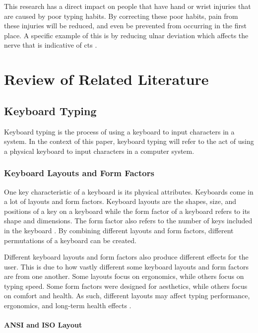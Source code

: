 \documentclass{report}
\begin{document}
This research has a direct impact on people that have hand or wrist injuries
that are caused by poor typing habits. By correcting these poor habits, pain
from these injuries will be reduced, and even be prevented from occurring in the
first place. A specific example of this is by reducing ulnar deviation which
affects the nerve that is indicative of \ac{cts} \parencite{toosi2015}.

\chapter{Review of Related Literature}

\section{Keyboard Typing}

Keyboard typing is the process of using a keyboard to input characters in a
system. In the context of this paper, keyboard typing will refer to the act of
using a physical keyboard to input characters in a computer system.

\subsection{Keyboard Layouts and Form Factors}

One key characteristic of a keyboard is its physical attributes. Keyboards come
in a lot of layouts and form factors. Keyboard layouts are the shapes, size, and
positions of a key on a keyboard while the form factor of a keyboard refers to
its shape and dimensions. The form factor also refers to the number of keys included
in the keyboard \parencite{parkkinen2018}. By combining different layouts and
form factors, different permutations of a keyboard can be created.

Different keyboard layouts and form factors also produce different effects for
the user. This is due to how vastly different some keyboard layouts and form
factors are from one another. Some layouts focus on ergonomics, while others
focus on typing speed. Some form factors were designed for aesthetics, while
others focus on comfort and health. As such, different layouts may affect typing
performance, ergonomics, and long-term health effects \parencite{ciobanu2015}.

\subsubsection{ANSI and ISO Layout}
\end{document}
